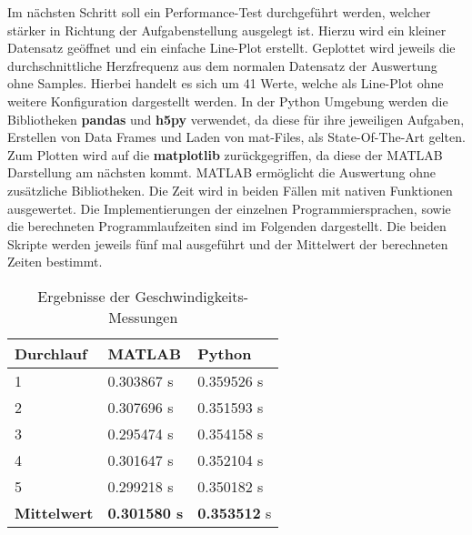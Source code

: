 Im nächsten Schritt soll ein Performance-Test durchgeführt werden, welcher stärker in Richtung der Aufgabenstellung ausgelegt ist. Hierzu wird ein kleiner Datensatz geöffnet und ein einfache Line-Plot erstellt. Geplottet wird jeweils die durchschnittliche Herzfrequenz aus dem normalen Datensatz der Auswertung ohne Samples. Hierbei handelt es sich um 41 Werte, welche als Line-Plot ohne weitere Konfiguration dargestellt werden. In der Python Umgebung werden die Bibliotheken \textbf{pandas} und \textbf{h5py} verwendet, da diese für ihre jeweiligen Aufgaben, Erstellen von Data Frames und Laden von mat-Files, als State-Of-The-Art gelten. Zum Plotten wird auf die \textbf{matplotlib} zurückgegriffen, da diese der MATLAB Darstellung am nächsten kommt. MATLAB ermöglicht die Auswertung ohne zusätzliche Bibliotheken. Die Zeit wird in beiden Fällen mit nativen Funktionen ausgewertet. Die Implementierungen der einzelnen Programmiersprachen, sowie die berechneten Programmlaufzeiten sind im Folgenden dargestellt. Die beiden Skripte werden jeweils fünf mal ausgeführt und der Mittelwert der berechneten Zeiten bestimmt.





\begin{table}[H]
	\centering
	\begin{tabular}{|l|l|l|}
		\multicolumn{1}{l}{\textbf{Durchlauf}} & \multicolumn{1}{l}{\textbf{MATLAB}} & \multicolumn{1}{l}{\textbf{Python}}  \\ 
		\hline
		1                                      & 0.303867 s                          & 0.359526
		s                           \\ 
		\hline
		2                                      & 0.307696
		s                          & 0.351593
		s                           \\ 
		\hline
		3                                      & 0.295474
		s                          & 0.354158
		s                           \\ 
		\hline
		4                                      & 0.301647 s                          & 0.352104 s                           \\ 
		\hline
		5                                      & 0.299218 s                          & 0.350182 s                           \\ 
		\hline
		\textbf{Mittelwert}                    & \textbf{0.301580 s}                          & \textbf{0.353512} s                           \\
		\hline
	\end{tabular}
		\caption{Ergebnisse der Geschwindigkeits-Messungen}
\end{table}

